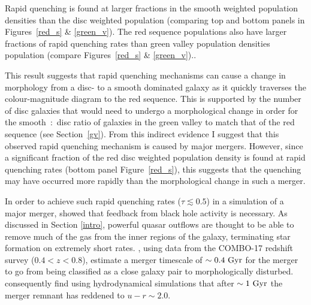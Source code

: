 Rapid quenching is found at larger fractions in the smooth weighted population densities than the disc weighted population (comparing top and bottom panels in Figures~\ref{red_s} \& \ref{green_v}). The red sequence populations also have larger fractions of rapid quenching rates than green valley population densities population (compare Figures~\ref{red_s} \& \ref{green_v}).. 

This result suggests that rapid quenching mechanisms can cause a change in morphology from a disc- to a smooth dominated galaxy as it quickly traverses the colour-magnitude diagram to the red sequence. This is supported by the number of disc galaxies that would need to undergo a morphological change in order for the smooth~:~disc ratio of galaxies in the green valley to match that of the red sequence (see Section~\ref{gv}). From this indirect evidence I suggest that this observed rapid quenching mechanism is caused by major mergers. However, since a significant fraction of the red disc weighted population density is found at rapid quenching rates (bottom panel Figure~\ref{red_s}), this suggests that the quenching may have occurred more rapidly than the morphological change in such a merger.


In order to achieve such rapid quenching rates ($\tau \lesssim 0.5$) in a simulation of a major merger, \citet*{springel05b} showed that feedback from black hole activity is necessary. As discussed in Section \ref{intro}, powerful quasar outflows are thought to be able to remove much of the gas from the inner regions of the galaxy, terminating star formation on extremely short rates. \citet{Bell06}, using data from the COMBO-17 redshift survey ($0.4 < z < 0.8$), estimate a merger timescale of $\sim 0.4~\rm{Gyr}$ for the merger to go from being classified as a close galaxy pair to morphologically disturbed. \citet*{springel05b} consequently find using hydrodynamical simulations that after $\sim1~\rm{Gyr}$ the merger remnant has reddened to $u-r \sim 2.0$. 


